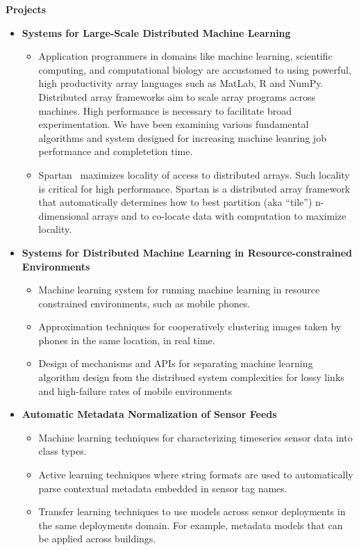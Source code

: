 \documentclass[letterpaper,11pt]{article}
\newcommand{\resitem}[1]{\item #1 \vspace{-2pt}}
\newcommand{\resheading}[1]{{\large \colorbox{mygrey}{\begin{minipage}{\textwidth}{\textbf{#1 \vphantom{p\^{E}}}}\end{minipage}}}}
\begin{document}
\resheading{Projects}
\begin{itemize}
    \item {\textbf{Systems for Large-Scale Distributed Machine Learning}}
            \begin{itemize}
                \resitem{Application programmers in domains like machine learning, scientific computing, and computational biology are accustomed to using powerful, high productivity array languages such as MatLab, R and NumPy. Distributed array frameworks aim to scale array programs across machines. High performance is necessary to facilitate broad experimentation.  We have been examining various fundamental algorithms and system designed for increasing machine leanring job performance and completetion time.}
                \resitem{Spartan~\cite{spartan} maximizes locality of access to distributed arrays. Such locality is critical for high performance.  Spartan is a distributed array framework that automatically determines how to best partition (aka “tile”) n-dimensional arrays and to co-locate data with computation to maximize locality.}
            \end{itemize}

    \item {\textbf{Systems for Distributed Machine Learning in Resource-constrained Environments}}
        \begin{itemize}
            \resitem{Machine learning system for running machine learning in resource constrained environments, such as mobile phones.}
            \resitem{Approximation techniques for cooperatively clustering images taken by phones in the same location, in real time.}
            \resitem{Design of mechanisms and APIs for separating machine learning algorithm design from the distribued system complexities for lossy links and high-failure rates of mobile environments} 
        \end{itemize}

    \item {\textbf{Automatic Metadata Normalization of Sensor Feeds}}
        \begin{itemize}
            \resitem{Machine learning techniques for characterizing timeseries sensor data into class types.}
            \resitem{Active learning techniques where string formats are used to automatically parse contextual metadata embedded in sensor tag names.\cite{Arka_buildsys2015}}
            \resitem{Transfer learning techniques to use models across sensor deployments in the same deployments domain.  For example, metadata models that can be applied across buildings.~\cite{Fontugne:2013:SBS:2461381.2461399,Hong:2013:TAS:2528282.2528302,Dezhi_buildsys2015}}
        \end{itemize}
\end{itemize}
\end{document}
